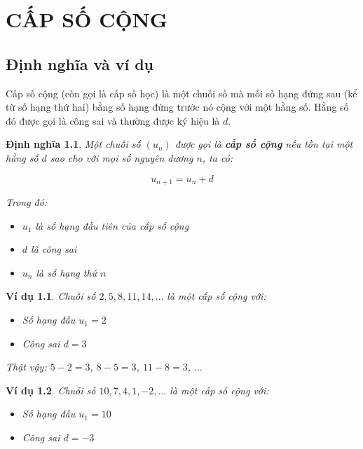 \documentclass[12pt,a4paper]{report}
\newtheorem{definition}{Định nghĩa}[section]
\newtheorem{example}{Ví dụ}[section]
\begin{document}
\clearpage

\tableofcontents

\listoftables

\clearpage


\chapter{CẤP SỐ CỘNG}

\section{Định nghĩa và ví dụ}

Cấp số cộng (còn gọi là cấp số học) là một chuỗi số mà mỗi số hạng đứng sau (kể từ số hạng thứ hai) bằng số hạng đứng trước nó cộng với một hằng số. Hằng số đó được gọi là công sai và thường được ký hiệu là $d$.

\begin{definition}
    Một chuỗi số $(u_n)$ được gọi là \textbf{cấp số cộng} nếu tồn tại một hằng số $d$ sao cho với mọi số nguyên dương $n$, ta có:
    
    \[
        u_{n+1} = u_n + d
    \]
    
    Trong đó:
    \begin{itemize}[label=\textbullet]
        \item $u_1$ là số hạng đầu tiên của cấp số cộng
        \item $d$ là công sai
        \item $u_n$ là số hạng thứ $n$
    \end{itemize}
\end{definition}

\begin{example}
    Chuỗi số $2, 5, 8, 11, 14, \dots$ là một cấp số cộng với:
    
    \begin{itemize}[label=\textbullet]
        \item Số hạng đầu $u_1 = 2$
        \item Công sai $d = 3$
    \end{itemize}
    
    Thật vậy: $5 - 2 = 3$, $8 - 5 = 3$, $11 - 8 = 3$, $\dots$
\end{example}

\begin{example}
    Chuỗi số $10, 7, 4, 1, -2, \dots$ là một cấp số cộng với:
    
    \begin{itemize}[label=\textbullet]
        \item Số hạng đầu $u_1 = 10$
        \item Công sai $d = -3$
    \end{itemize}
\end{example}
\end{document}
